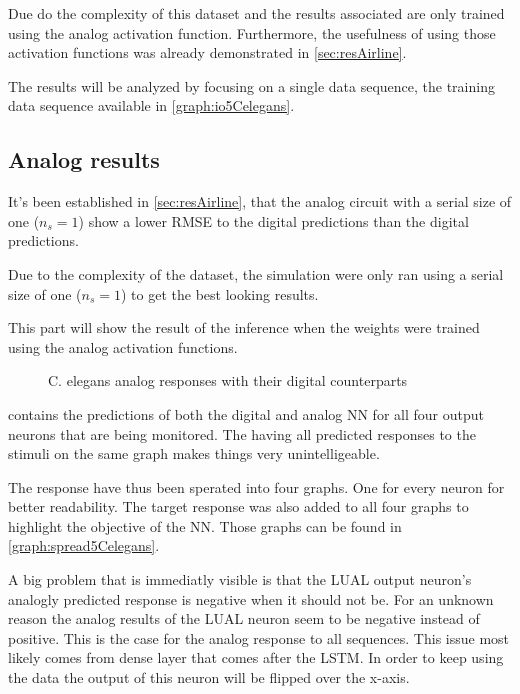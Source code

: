 Due do the complexity of this dataset and the results associated are only trained using the analog activation function. Furthermore, the usefulness of using those activation functions was already demonstrated in \cref{sec:resAirline}.

The results will be analyzed by focusing on a single data sequence, the training data sequence available in \cref{graph:io5Celegans}.

\subsection{Analog results}
\label{subsec:analogCelegans}

It's been established in \cref{sec:resAirline}, that the analog circuit with a serial size of one ($n_s=1$) show a lower \ac{RMSE} to the digital predictions than the digital predictions.

Due to the complexity of the dataset, the simulation were only ran using a serial size of one ($n_s=1$) to get the best looking results.

This part will show the result of the inference when the weights were trained using the analog activation functions.

\begin{figure}[H]
  \centering
  
  \caption{\acs{C. elegans} analog responses with their digital counterparts}
  \label{graph:celegansAnalog0}
\end{figure}

 contains the predictions of both the digital and analog \ac{NN} for all four output neurons that are being monitored. The having all predicted responses to the stimuli on the same graph makes things very unintelligeable.

The response have thus been sperated into four graphs. One for every neuron for better readability. The target response was also added to all four graphs to highlight the objective of the \ac{NN}. Those graphs can be found in \cref{graph:spread5Celegans}.

A big problem that is immediatly visible is that the LUAL output neuron's analogly predicted response is negative when it should not be. For an unknown reason the analog results of the LUAL neuron seem to be negative instead of positive. This is the case for the analog response to all sequences. This issue most likely comes from dense layer that comes after the \ac{LSTM}. In order to keep using the data the output of this neuron will be flipped over the x-axis.


